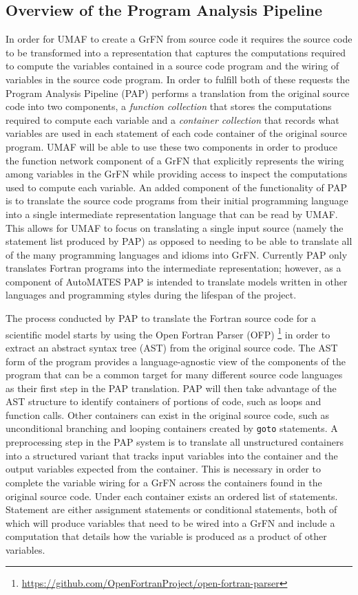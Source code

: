 \subsection{Overview of the Program Analysis Pipeline\label{sec:pa_overview}}
In order for UMAF to create a GrFN from source code it requires the source code to be transformed into a representation that captures the computations required to compute the variables contained in a source code program and the wiring of variables in the source code program.
In order to fulfill both of these requests the Program Analysis Pipeline (PAP) performs a translation from the original source code into two components, a \textit{function collection} that stores the computations required to compute each variable and a \textit{container collection} that records what variables are used in each statement of each code container of the original source program.
UMAF will be able to use these two components in order to produce the function network component of a GrFN that explicitly represents the wiring among variables in the GrFN while providing access to inspect the computations used to compute each variable.
An added component of the functionality of PAP is to translate the source code programs from their initial programming language into a single intermediate representation language that can be read by UMAF.
This allows for UMAF to focus on translating a single input source (namely the statement list produced by PAP) as opposed to needing to be able to translate all of the many programming languages and idioms into GrFN.
Currently PAP only translates Fortran programs into the intermediate representation; however, as a component of AutoMATES PAP is intended to translate models written in other languages and programming styles during the lifespan of the project.

The process conducted by PAP to translate the Fortran source code for a scientific model starts by using the Open Fortran Parser (OFP) \footnote{\url{https://github.com/OpenFortranProject/open-fortran-parser}} in order to extract an abstract syntax tree (AST) \citep{aho1986dragonBook} from the original source code.
The AST form of the program provides a language-agnostic view of the components of the program that can be a common target for many different source code languages as their first step in the PAP translation.
PAP will then take advantage of the AST structure to identify containers of portions of code, such as loops and function calls.
Other containers can exist in the original source code, such as unconditional branching and looping containers created by \texttt{goto} statements.
A preprocessing step in the PAP system is to translate all unstructured containers into a structured variant that tracks input variables into the container and the output variables expected from the container.
This is necessary in order to complete the variable wiring for a GrFN across the containers found in the original source code.
Under each container exists an ordered list of statements.
Statement are either assignment statements or conditional statements, both of which will produce variables that need to be wired into a GrFN and include a computation that details how the variable is produced as a product of other variables.

